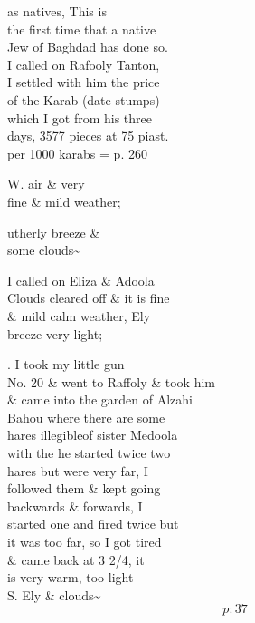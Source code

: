 \documentclass{report}
\begin{document}

	\par{
 	as natives, This is\ \\the first time that a native\ \\Jew of Baghdad has done so.\ \\I called on Rafooly Tanton,\ \\I settled with him the price\ \\of the Karab (date stumps)\ \\which I got from his three\ \\days, 3577 pieces at 75 piast.\ \\per 1000 karabs = p. 260\ \\
	}

	\par{
 	W. air \& very\ \\fine \& mild weather;\ \\
	}


	\par{
 	utherly breeze \&\ \\some clouds\~{}\ \\
	}

	\par{
 	I called on Eliza \& Adoola\ \\Clouds cleared off \& it is fine\ \\\& mild calm weather, Ely\ \\breeze very light;\ \\
	}

	\par{
 	. I took my little gun\ \\No. 20 \& went to Raffoly \& took him\ \\\& came into the garden of Alzahi\ \\Bahou where there are some\ \\hares \lbrack illegible\rbrack of sister Medoola\ \\with the he started twice two\ \\hares but were very far, I\ \\followed them \& kept going\ \\backwards \& forwards, I\ \\started one and fired twice but\ \\it was too far, so I got tired\ \\\& came back at 3 2/4, it\ \\is very warm, too light\ \\S. Ely \& clouds\~{}\ \\
  \[p: 37 \]

	}
\end{document}

